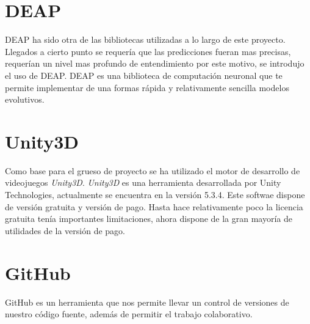 \section{DEAP}
DEAP ha sido otra de las bibliotecas utilizadas a lo largo de este proyecto. Llegados a cierto punto se requería que las predicciones fueran mas precisas, requerían un nivel mas profundo de entendimiento \cite{fortin2012deap} por este motivo, se introdujo el uso de DEAP. DEAP es una biblioteca de computación neuronal que te permite implementar de una formas rápida y relativamente sencilla modelos evolutivos.

\section{Unity3D}
Como base para el grueso de proyecto se ha utilizado el motor de desarrollo de videojuegos \emph{Unity3D}. \emph{Unity3D} es una herramienta desarrollada por Unity Technologies, actualmente se encuentra en la versión 5.3.4. Este softwae dispone de versión gratuita y versión de pago. Hasta hace relativamente poco la licencia gratuita tenía importantes limitaciones, ahora dispone de la gran mayoría de utilidades de la versión de pago. 

\section{GitHub}
GitHub es un herramienta que nos permite llevar un control de versiones de nuestro código fuente, además de permitir el trabajo colaborativo.


